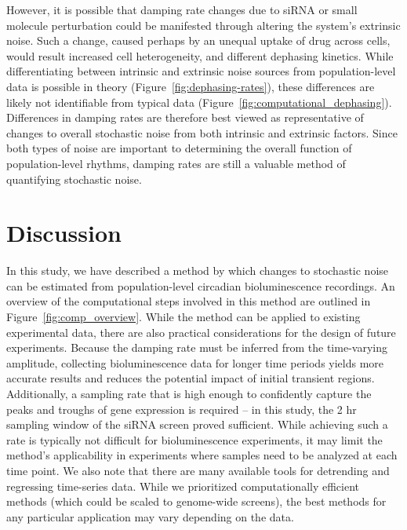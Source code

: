 \documentclass[11pt, letterpaper]{article}
\begin{document}
However, it is possible that damping rate changes due to siRNA or small molecule perturbation could be manifested through altering the system's extrinsic noise.
Such a change, caused perhaps by an unequal uptake of drug across cells, would result increased cell heterogeneity, and different dephasing kinetics.
While differentiating between intrinsic and extrinsic noise sources from population-level data is possible in theory (Figure~\ref{fig:dephasing-rates}), these differences are likely not identifiable from typical data (Figure~\ref{fig:computational_dephasing}).
Differences in damping rates are therefore best viewed as representative of changes to overall stochastic noise from both intrinsic and extrinsic factors.
Since both types of noise are important to determining the overall function of population-level rhythms, damping rates are still a valuable method of quantifying stochastic noise.


\section*{Discussion}

In this study, we have described a method by which changes to stochastic noise can be estimated from population-level circadian bioluminescence recordings.
An overview of the computational steps involved in this method are outlined in Figure~\ref{fig:comp_overview}.
While the method can be applied to existing experimental data, there are also practical considerations for the design of future experiments.
Because the damping rate must be inferred from the time-varying amplitude, collecting bioluminescence data for longer time periods yields more accurate results and reduces the potential impact of initial transient regions.
Additionally, a sampling rate that is high enough to confidently capture the peaks and troughs of gene expression is required -- in this study, the 2 hr sampling window of the siRNA screen proved sufficient.
While achieving such a rate is typically not difficult for bioluminescence experiments, it may limit the method's applicability in experiments where samples need to be analyzed at each time point.
We also note that there are many available tools for detrending and regressing time-series data.
While we prioritized computationally efficient methods (which could be scaled to genome-wide screens), the best methods for any particular application may vary depending on the data.
\end{document}
